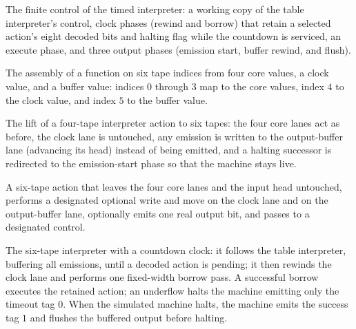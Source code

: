 \begin{definition}
\label{Turing.TimedControl}
\leanok
{}
The finite control of the timed interpreter: a working copy of the table
interpreter's control, clock phases (rewind and borrow) that retain a selected
action's eight decoded bits and halting flag while the countdown is serviced,
an execute phase, and three output phases (emission start, buffer rewind, and
flush).
\end{definition}

\begin{definition}
\label{Turing.timedSix}
\leanok
The assembly of a function on six tape indices from four core values, a clock
value, and a buffer value: indices $0$ through $3$ map to the core values,
index $4$ to the clock value, and index $5$ to the buffer value.
\end{definition}

\begin{definition}
\label{Turing.timedAction}
\leanok
{}
The lift of a four-tape interpreter action to six tapes: the four core lanes
act as before, the clock lane is untouched, any emission is written to the
output-buffer lane (advancing its head) instead of being emitted, and a
halting successor is redirected to the emission-start phase so that the
machine stays live.
\end{definition}

\begin{definition}
\label{Turing.timedAdmin}
\leanok
{}
A six-tape action that leaves the four core lanes and the input head
untouched, performs a designated optional write and move on the clock lane and
on the output-buffer lane, optionally emits one real output bit, and passes to
a designated control.
\end{definition}

\begin{definition}
\label{Turing.timedInterpreter}
\leanok
{}
The six-tape interpreter with a countdown clock: it follows the table
interpreter, buffering all emissions, until a decoded action is pending; it
then rewinds the clock lane and performs one fixed-width borrow pass.  A
successful borrow executes the retained action; an underflow halts the machine
emitting only the timeout tag $0$.  When the simulated machine halts, the
machine emits the success tag $1$ and flushes the buffered output before
halting.
\end{definition}

